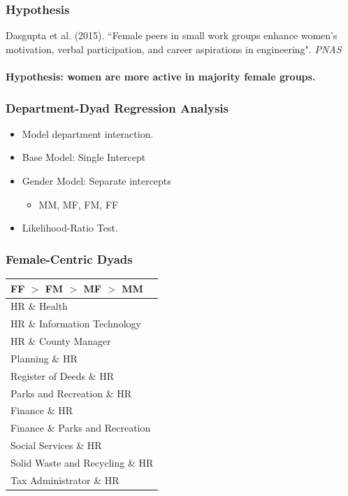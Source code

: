 \documentclass[xcolor={table}, fleqn]{beamer}
\newcommand{\male}[1]{\colorbox{male}{#1}}
\newcommand{\female}[1]{\colorbox{female}{#1}}
\begin{document}
\begin{frame}\frametitle{Hypothesis}
	\LARGE
Dasgupta et al. (2015). ``Female peers in small work groups enhance women’s motivation, verbal participation, and career aspirations in engineering". \emph{PNAS} \\~\\
\textbf{Hypothesis: women are more active in majority female groups.}
\end{frame}

\begin{frame}\frametitle{Department-Dyad Regression Analysis}
	\LARGE
	\begin{itemize}
		\item Model department interaction.
		\vspace*{.3in}
		\item Base Model: Single Intercept
		\vspace*{.3in}
		\item Gender Model: Separate intercepts
		\vspace*{.15in}
		\begin{itemize}
			\LARGE
			\item MM, MF, FM, FF
		\end{itemize}
		\vspace*{.15in}
		\item Likelihood-Ratio Test.
	\end{itemize}
\end{frame}


\begin{frame}\frametitle{Female-Centric Dyads}
	\centering
	\Large
	\begin{tabular}{l}
	  \toprule
	FF $>$ FM $>$ MF $>$ MM  \\
	\hline
	  \female{HR} \& Health  \\ 
	  \female{HR} \& \male{Information Technology}  \\ 
	  \female{HR} \& \male{County Manager}  \\ 
	  \male{Planning} \& \female{HR} \\ 
	  Register of Deeds \& \female{HR}  \\ 
	  Parks and Recreation \& \female{HR}  \\ 
	  \female{Finance} \& \female{HR}  \\ 
	  \female{Finance} \& Parks and Recreation  \\ 
	  Social Services \& \female{HR}  \\ 
	  \male{Solid Waste and Recycling} \& \female{HR}  \\ 
	  Tax Administrator \& \female{HR}  \\ 
	   \bottomrule
	\end{tabular}
	
	
	
	
\end{frame}
\end{document}
